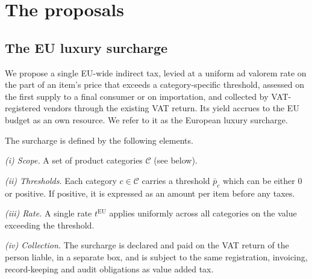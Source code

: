 \documentclass[../../main]{subfiles}
\begin{document}
\section{The proposals}


\subsection{The EU luxury surcharge} %

We propose a single EU-wide indirect tax, levied at a uniform ad valorem rate on the part of an item's price that exceeds a category-specific threshold, assessed on the first supply to a final consumer or on importation, and collected by VAT-registered vendors through the existing VAT return. Its yield accrues to the EU budget as an own resource. We refer to it as the European luxury surcharge.


The surcharge is defined by the following elements.

\emph{(i) Scope.} A set of product categories $\mathcal{C}$ (see below). %

\emph{(ii) Thresholds.} Each category $c \in \mathcal{C}$ carries a threshold $\bar{p}_c$ which can be either 0 or positive. If positive, it is expressed as an amount per item before any taxes.

\emph{(iii) Rate.} A single rate $t^{\mathrm{EU}}$ applies uniformly across all categories on the value exceeding the threshold. %

\emph{(iv) Collection.} The surcharge is declared and paid on the VAT return of the person liable, in a separate box, and is subject to the same registration, invoicing, record-keeping and audit obligations as value added tax.
\end{document}
